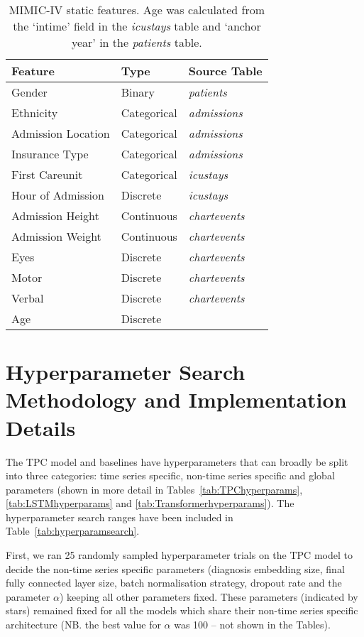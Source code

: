 \documentclass[sigconf]{acmart}
\begin{document}
\begin{table}[h]
    \caption{MIMIC-IV static features. Age was calculated from the `intime' field in the \textit{icustays} table and `anchor year' in the \textit{patients} table.}
    \label{tab:staticMIMIC}
    \centering
    \begin{tabular}{lll}
        \toprule
        \textbf{Feature} & \textbf{Type} & \textbf{Source Table} \\
        \midrule
        Gender & Binary & \textit{patients} \\
        Ethnicity & Categorical & \textit{admissions} \\
        Admission Location & Categorical & \textit{admissions} \\
        Insurance Type & Categorical & \textit{admissions} \\
        First Careunit & Categorical & \textit{icustays} \\
        Hour of Admission & Discrete & \textit{icustays} \\
        Admission Height & Continuous & \textit{chartevents} \\
        Admission Weight & Continuous & \textit{chartevents} \\
        Eyes & Discrete & \textit{chartevents} \\
        Motor & Discrete & \textit{chartevents} \\
        Verbal & Discrete & \textit{chartevents} \\
        Age & Discrete & \\
        \bottomrule
    \end{tabular}
\end{table}

\section{Hyperparameter Search Methodology and Implementation Details}
\label{hyperparamsearch}

The TPC model and baselines have hyperparameters that can broadly be split into three categories: time series specific, non-time series specific and global parameters (shown in more detail in Tables~\ref{tab:TPChyperparams}, \ref{tab:LSTMhyperparams} and \ref{tab:Transformerhyperparams}). The hyperparameter search ranges have been included in Table~\ref{tab:hyperparamsearch}. 

First, we ran 25 randomly sampled hyperparameter trials on the TPC model to decide the non-time series specific parameters (diagnosis embedding size, final fully connected layer size, batch normalisation strategy, dropout rate and the parameter $\alpha$) keeping all other parameters fixed. These parameters (indicated by stars) remained fixed for all the models which share their non-time series specific architecture (NB. the best value for $\alpha$ was 100 -- not shown in the Tables). 
\end{document}
